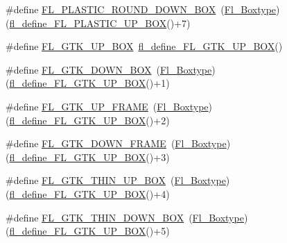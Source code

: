\begin{DoxyCompactItemize}
\item 
\#define \hyperlink{_enumerations_8_h_a261020ee5b7f94f75a2d667c68521d78}{F\+L\+\_\+\+P\+L\+A\+S\+T\+I\+C\+\_\+\+R\+O\+U\+N\+D\+\_\+\+D\+O\+W\+N\+\_\+\+B\+OX}~(\hyperlink{_enumerations_8_h_ae48bf9070f8541de17829f54ccacc6bc}{Fl\+\_\+\+Boxtype})(\hyperlink{_enumerations_8_h_a5789d998f2b5e51e11e386fcbbe7bbb2}{fl\+\_\+define\+\_\+\+F\+L\+\_\+\+P\+L\+A\+S\+T\+I\+C\+\_\+\+U\+P\+\_\+\+B\+OX}()+7)
\item 
\#define \hyperlink{_enumerations_8_h_a3a2557d7c3ab38846e738284a6e8a2ff}{F\+L\+\_\+\+G\+T\+K\+\_\+\+U\+P\+\_\+\+B\+OX}~\hyperlink{_enumerations_8_h_acddcd32d55f441d62bee63ce326d5f2c}{fl\+\_\+define\+\_\+\+F\+L\+\_\+\+G\+T\+K\+\_\+\+U\+P\+\_\+\+B\+OX}()
\item 
\#define \hyperlink{_enumerations_8_h_a3a528a8f0c33e1fb67e36204d1f73400}{F\+L\+\_\+\+G\+T\+K\+\_\+\+D\+O\+W\+N\+\_\+\+B\+OX}~(\hyperlink{_enumerations_8_h_ae48bf9070f8541de17829f54ccacc6bc}{Fl\+\_\+\+Boxtype})(\hyperlink{_enumerations_8_h_acddcd32d55f441d62bee63ce326d5f2c}{fl\+\_\+define\+\_\+\+F\+L\+\_\+\+G\+T\+K\+\_\+\+U\+P\+\_\+\+B\+OX}()+1)
\item 
\#define \hyperlink{_enumerations_8_h_a017e1bfd1fbdbb8da13f92f9ff14cb24}{F\+L\+\_\+\+G\+T\+K\+\_\+\+U\+P\+\_\+\+F\+R\+A\+ME}~(\hyperlink{_enumerations_8_h_ae48bf9070f8541de17829f54ccacc6bc}{Fl\+\_\+\+Boxtype})(\hyperlink{_enumerations_8_h_acddcd32d55f441d62bee63ce326d5f2c}{fl\+\_\+define\+\_\+\+F\+L\+\_\+\+G\+T\+K\+\_\+\+U\+P\+\_\+\+B\+OX}()+2)
\item 
\#define \hyperlink{_enumerations_8_h_a750366c4bc1f27fe04af93e4e715bf82}{F\+L\+\_\+\+G\+T\+K\+\_\+\+D\+O\+W\+N\+\_\+\+F\+R\+A\+ME}~(\hyperlink{_enumerations_8_h_ae48bf9070f8541de17829f54ccacc6bc}{Fl\+\_\+\+Boxtype})(\hyperlink{_enumerations_8_h_acddcd32d55f441d62bee63ce326d5f2c}{fl\+\_\+define\+\_\+\+F\+L\+\_\+\+G\+T\+K\+\_\+\+U\+P\+\_\+\+B\+OX}()+3)
\item 
\#define \hyperlink{_enumerations_8_h_af993169ad2ca66074e91f3b8bda7f2f8}{F\+L\+\_\+\+G\+T\+K\+\_\+\+T\+H\+I\+N\+\_\+\+U\+P\+\_\+\+B\+OX}~(\hyperlink{_enumerations_8_h_ae48bf9070f8541de17829f54ccacc6bc}{Fl\+\_\+\+Boxtype})(\hyperlink{_enumerations_8_h_acddcd32d55f441d62bee63ce326d5f2c}{fl\+\_\+define\+\_\+\+F\+L\+\_\+\+G\+T\+K\+\_\+\+U\+P\+\_\+\+B\+OX}()+4)
\item 
\#define \hyperlink{_enumerations_8_h_ade14a87733635b6adec1ad50aa3b83fd}{F\+L\+\_\+\+G\+T\+K\+\_\+\+T\+H\+I\+N\+\_\+\+D\+O\+W\+N\+\_\+\+B\+OX}~(\hyperlink{_enumerations_8_h_ae48bf9070f8541de17829f54ccacc6bc}{Fl\+\_\+\+Boxtype})(\hyperlink{_enumerations_8_h_acddcd32d55f441d62bee63ce326d5f2c}{fl\+\_\+define\+\_\+\+F\+L\+\_\+\+G\+T\+K\+\_\+\+U\+P\+\_\+\+B\+OX}()+5)

\end{DoxyCompactItemize}
